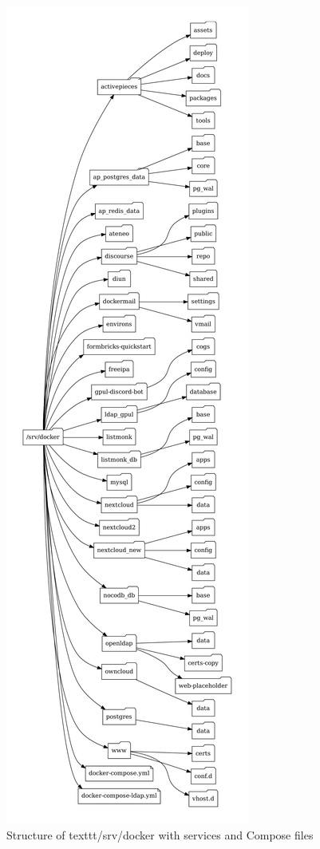 \begin{figure}[H]
  \centering
  \includegraphics[height=0.9\textheight]{figuras/gpulon_dir_tree_srv_docker.pdf}
  \caption{Structure of texttt{/srv/docker} with services and Compose files}
  \label{fig:gpulon_dir_tree_srv_docker}
\end{figure}

